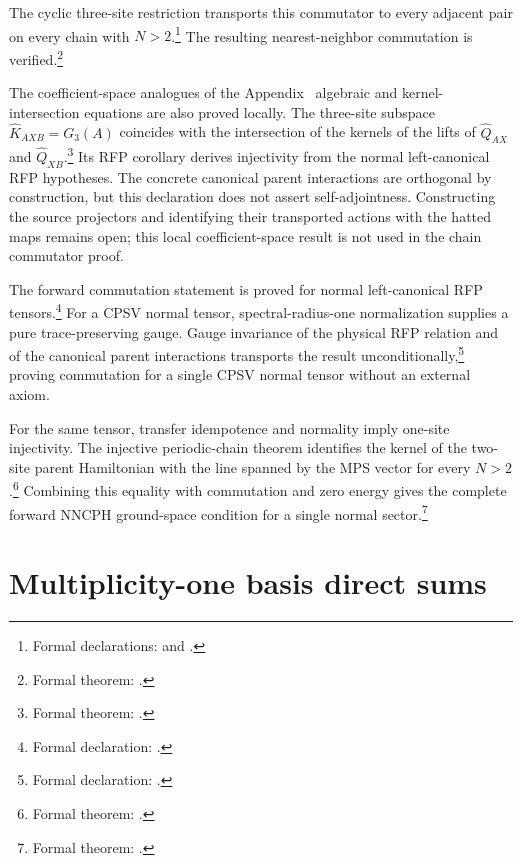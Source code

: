 \documentclass{article}
\begin{document}
The cyclic three-site restriction transports this commutator to every adjacent
pair on every chain with $N>2$.\footnote{Formal declarations:
and .}
The resulting nearest-neighbor commutation is verified.\footnote{Formal theorem:
.}

The coefficient-space analogues of the Appendix~
algebraic and kernel-intersection equations are also proved locally. The
three-site subspace $\widehat K_{AXB}=G_3(A)$ coincides with the intersection
of the kernels of the lifts of $\widehat Q_{AX}$ and $\widehat
Q_{XB}$.\footnote{Formal theorem:
.}
Its RFP corollary derives injectivity from the normal left-canonical RFP
hypotheses. The concrete canonical parent interactions are orthogonal by
construction, but this declaration does not assert self-adjointness.
Constructing the source projectors and identifying their transported actions
with the hatted maps remains open; this local coefficient-space result is not
used in the chain commutator proof.

The forward commutation statement is proved for normal
left-canonical RFP tensors.\footnote{Formal declaration:
.} For a
CPSV normal tensor, spectral-radius-one normalization supplies a pure
trace-preserving gauge. Gauge invariance of the physical RFP relation and of
the canonical parent interactions transports the result
unconditionally,\footnote{Formal declaration:
.} proving commutation
for a single CPSV normal tensor without an external axiom.

For the same tensor, transfer idempotence and normality imply one-site
injectivity. The injective periodic-chain theorem identifies the kernel of the
two-site parent Hamiltonian with the line spanned by the MPS vector for every
$N>2$.\footnote{Formal theorem:
.} Combining
this equality with commutation and zero energy gives the complete forward
NNCPH ground-space condition for a single normal sector.\footnote{Formal theorem:
.}

\section{Multiplicity-one basis direct sums}
\end{document}
